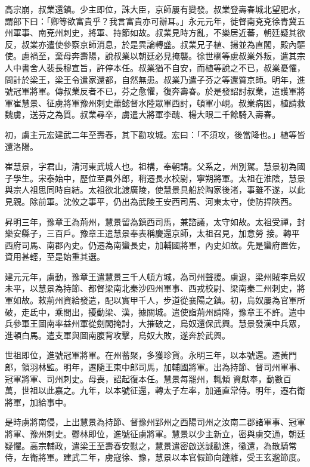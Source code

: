 \begin{pinyinscope}
 高宗崩，叔業還鎮。少主即位，誅大臣，京師屢有變發。叔業登壽春城北望肥水，謂部下曰：「卿等欲富貴乎？我言富貴亦可辦耳。」永元元年，徙督南兗兗徐青冀五州軍事、南兗州刺史，將軍、持節如故。叔業見時方亂，不樂居近蕃，朝廷疑其欲反，叔業亦遣使參察京師消息，於是異論轉盛。叔業兄子植、揚並為直閣，殿內驅使。慮禍至，棄母奔壽陽，說叔業以朝廷必見掩襲。徐世檦等慮叔業外叛，遣其宗人中書舍人裴長穆宣旨，許停本任。叔業猶不自安，而植等說之不已，叔業憂懼，問計於梁王，梁王令遣家還都，自然無患。叔業乃遣子芬之等還質京師。明年，進
 號冠軍將軍。傳叔業反者不已，芬之愈懼，復奔壽春。於是發詔討叔業，遣護軍將軍崔慧景、征虜將軍豫州刺史蕭懿督水陸眾軍西討，頓軍小峴。叔業病困，植請救魏虜，送芬之為質。叔業尋卒，虜遣大將軍李醜、楊大眼二千餘騎入壽春。



 初，虜主元宏建武二年至壽春，其下勸攻城。宏曰：「不須攻，後當降也。」植等皆還洛陽。



 崔慧景，字君山，清河東武城人也。祖構，奉朝請。父系之，州別駕。慧景初為國子學生。宋泰始中，歷位至員外郎，稍遷長水校尉，寧朔將軍。太祖在淮陰，慧景與宗人祖思同時自結。太祖欲北渡廣陵，使慧景具船於陶家後渚，事雖不遂，以此見親。除前軍。沈攸之事平，仍出為武陵王安西司馬、河東太守，使防捍陜西。



 昇明三年，豫章王為荊州，慧景留為鎮西司馬，兼諮議，太守如故。太祖受禪，封樂安縣子，三百戶。豫章王遣慧景奉表稱慶還京師，太祖召見，加意勞
 接。轉平西府司馬、南郡內史。仍遷為南蠻長史，加輔國將軍，內史如故。先是蠻府置佐，資用甚輕，至是始重其選。



 建元元年，虜動，豫章王遣慧景三千人頓方城，為司州聲援。虜退，梁州賊李烏奴未平，以慧景為持節、都督梁南北秦沙四州軍事、西戎校尉、梁南秦二州刺史，將軍如故。敕荊州資給發遣，配以實甲千人，步道從襄陽之鎮。初，烏奴屢為官軍所破，走氐中，乘間出，擾動梁、漢，據關城。遣使詣荊州請降，豫章王不許。遣中兵參軍王圖南率益州軍從劍閣掩討，大摧破之，烏奴還保武興。慧景發漢中兵眾，進頓白馬。遣支軍與圖南腹背攻擊，烏奴大敗，遂奔於武興。



 世祖即位，進號冠軍將軍。在州蓄聚，多獲珍貨。永明三年，以本號還。遷黃門郎，領羽林監。明年，遷隨王東中郎司馬，加輔國將軍。出為持節、督司州軍事、冠軍將軍、司州刺史。母喪，詔起復本任。慧景每罷州，輒傾
 資獻奉，動數百萬，世祖以此嘉之。九年，以本號征還，轉太子左率，加通直常侍。明年，遷右衛將軍，加給事中。



 是時虜將南侵，上出慧景為持節、督豫州郢州之西陽司州之汝南二郡諸軍事、冠軍將軍、豫州刺史。鬱林即位，進號征虜將軍。慧景以少主新立，密與虜交通，朝廷疑懼。高宗輔政，遣梁王至壽春安慰之，慧景遣密啟送誠勸進，徵還，為散騎常侍，左衛將軍。建武二年，虜寇徐、豫，慧景以本官假節向鐘離，受王玄邈節度。




\end{pinyinscope}

